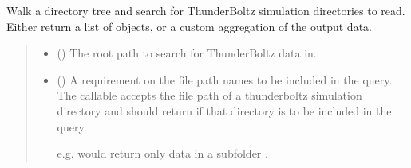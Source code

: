 \documentclass[letterpaper,10pt,english,openany,oneside]{sphinxmanual}
\begin{document}
\begin{fulllineitems}
\label{\detokenize{api/pytb.tb.query_tree:pytb.tb.query_tree}}
\pysigstartsignatures
{}
\pysigstopsignatures
\sphinxAtStartPar
Walk a directory tree and search for ThunderBoltz
simulation directories to read. Either return a list of
{\hyperref[\detokenize{api/pytb.ThunderBoltz:pytb.ThunderBoltz}]{}} objects, or a custom aggregation of
the output data.
\begin{quote}\begin{description}
\begin{itemize}
\item {} 
\sphinxAtStartPar
{} () \textendash{} The root path to search for ThunderBoltz
data in.

\item {} 
\sphinxAtStartPar
{} (\sphinxstyleliteralemphasis{\sphinxupquote{{[}}}\sphinxstyleliteralemphasis{\sphinxupquote{,}}\sphinxstyleliteralemphasis{\sphinxupquote{{]}}}) \textendash{} 
\sphinxAtStartPar
A requirement on the file path
names to be included in the query. The callable accepts
the file path of a thunderboltz simulation directory and
should return  if that directory is to be included
in the query.

\sphinxAtStartPar
e.g. 
would return only data in a subfolder .



\end{itemize}
\end{description}
\end{quote}
\end{fulllineitems}
\end{document}
